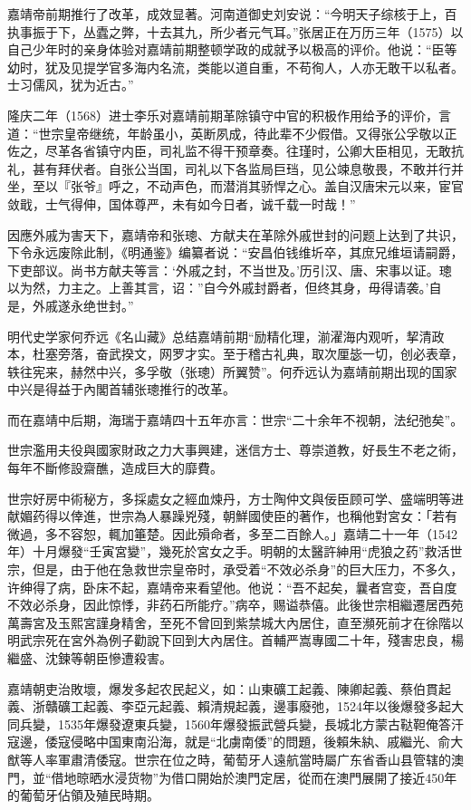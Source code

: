嘉靖帝前期推行了改革，成效显著。河南道御史刘安说：“今明天子综核于上，百执事振于下，丛蠹之弊，十去其九，所少者元气耳。”张居正在万历三年（1575）以自己少年时的亲身体验对嘉靖前期整顿学政的成就予以极高的评价。他说：“臣等幼时，犹及见提学官多海内名流，类能以道自重，不苟徇人，人亦无敢干以私者。士习儒风，犹为近古。”

隆庆二年（1568）进士李乐对嘉靖前期革除镇守中官的积极作用给予的评价，言道：“世宗皇帝继统，年龄虽小，英断夙成，待此辈不少假借。又得张公孚敬以正佐之，尽革各省镇守内臣，司礼监不得干预章奏。往瑾时，公卿大臣相见，无敢抗礼，甚有拜伏者。自张公当国，司礼以下各监局巨珰，见公竦息敬畏，不敢并行并坐，至以『张爷』呼之，不动声色，而潜消其骄悍之心。盖自汉唐宋元以来，宦官敛戢，士气得伸，国体尊严，未有如今日者，诚千载一时哉！”

因應外戚为害天下，嘉靖帝和张璁、方献夫在革除外戚世封的问题上达到了共识，下令永远废除此制，《明通鉴》编纂者说：“安昌伯钱维圻卒，其庶兄维垣请嗣爵，下吏部议。尚书方献夫等言：‘外戚之封，不当世及。’历引汉、唐、宋事以证。璁以为然，力主之。上善其言，诏：”自今外戚封爵者，但终其身，毋得请袭。’自是，外戚遂永绝世封。”

明代史学家何乔远《名山藏》总结嘉靖前期“励精化理，湔濯海内观听，挈清政本，杜塞旁落，奋武揆文，网罗才实。至于稽古礼典，取次厘毖一切，创必表章，轶往宪来，赫然中兴，多孚敬（张璁）所翼赞”。何乔远认为嘉靖前期出现的国家中兴是得益于內閣首辅张璁推行的改革。

而在嘉靖中后期，海瑞于嘉靖四十五年亦言：世宗“二十余年不视朝，法纪弛矣”。

世宗濫用夫役與國家財政之力大事興建，迷信方士、尊崇道教，好長生不老之術，每年不斷修設齋醮，造成巨大的靡費。

世宗好房中術秘方，多採處女之經血煉丹，方士陶仲文與佞臣顾可学、盛端明等进献媚药得以倖進，世宗為人暴躁兇殘，朝鮮國使臣的著作，也稱他對宮女：「若有微過，多不容恕，輒加箠楚。因此殞命者，多至二百餘人。」嘉靖二十一年（1542年）十月爆發“壬寅宮變”，幾死於宮女之手。明朝的太醫許紳用“虎狼之药”救活世宗，但是，由于他在急救世宗皇帝时，承受着“不效必杀身”的巨大压力，不多久，许绅得了病，卧床不起，嘉靖帝来看望他。他说：“吾不起矣，曩者宫变，吾自度不效必杀身，因此惊悸，非药石所能疗。”病卒，赐谥恭僖。此後世宗相繼遷居西苑萬壽宮及玉熙宮謹身精舍，至死不曾回到紫禁城大內居住，直至瀕死前才在徐階以明武宗死在宮外為例子勸說下回到大內居住。首輔严嵩專國二十年，殘害忠良，楊繼盛、沈鍊等朝臣慘遭殺害。

嘉靖朝吏治敗壞，爆发多起农民起义，如：山東礦工起義、陳卿起義、蔡伯貫起義、浙贛礦工起義、李亞元起義、賴清規起義，邊事廢弛，1524年以後爆發多起大同兵變，1535年爆發遼東兵變，1560年爆發振武營兵變，長城北方蒙古鞑靼俺答汗寇邊，倭寇侵略中国東南沿海，就是“北虜南倭”的問題，後賴朱紈、戚繼光、俞大猷等人率軍肅清倭寇。世宗在位之時，葡萄牙人遠航當時屬广东省香山县管辖的澳門，並“借地晾晒水浸货物”为借口開始於澳門定居，從而在澳門展開了接近450年的葡萄牙佔領及殖民時期。

